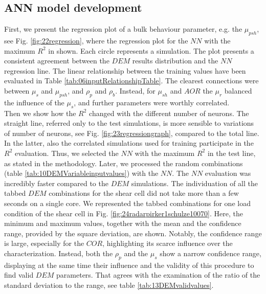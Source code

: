 \subsection{ANN model development}
\label{subsec:annmodeldev}

First, we present the regression plot of a bulk behaviour parameter, e.g. the
$\mu_{psh}$, see Fig. \ref{fig:22regression}, where the regression plot for
the $NN$ with the maximum $R^2$ in shown. Each circle represents a simulation. 
The plot presents a consistent agreement between the $DEM$ results distribution and the $NN$ regression line.
% 
The linear relationship between the
training values have been evaluated in Table \ref{tab:06inputRelationshipTable}.
The clearest connections were between $\mu_s$ and $\mu_{psh}$, and
$\rho_p$ and $\rho_b$.
Instead, for $\mu_{sh}$ and $AOR$ the $\mu_r$ balanced the influence of the 
$\mu_s$, and further parameters were worthly correlated. \\
% 
Then we show how the $R^2$ changed with the different number of neurons. The
straight line, referred only to the test simulations, is more sensible to
variations of number of neurons, see Fig. \ref{fig:23regressiongraph}, compared
to the total line. In the latter, also the correlated simulations used for
training participate in the $R^2$ evaluation.
% 
Thus, we selected the $NN$ with the maximum $R^2$ in the test line, as stated in the methodology.
Later, we processed the random combinations (table
\ref{tab:10DEMVariableinputvalues}) with the $NN$.
The $NN$ evaluation was incredibly faster compared to the $DEM$ simulations. The
individuation of all the tabbed $DEM$ combinations for the shear cell did not take more than a few seconds on a single core. 
We represented the tabbed combinations for one load condition of the shear cell in Fig.
\ref{fig:24radarpirker1schulze10070}.
% 
Here, the minimum and maximum values, together with the mean and the confidence
range, provided by the square deviation, are shown. Notably, the confidence range is large, 
especially for the $COR$, highlighting its scarce influence over the characterization. 
Instead, both the $\rho_p$  and the $\mu_s$ show a narrow confidence range, 
displaying at the same time their influence and the validity of this procedure to find valid $DEM$ parameters. 
That agrees with the examination of the ratio of the standard deviation to the
range, see table \ref{tab:13DEMvalidvalues}.
